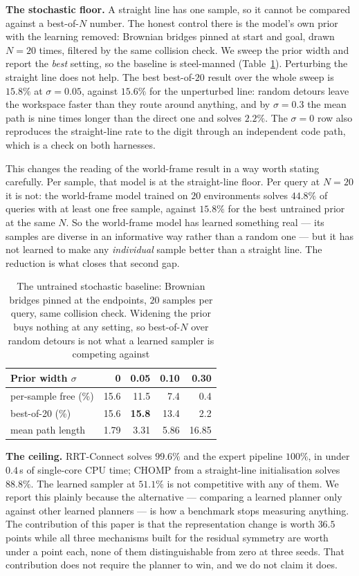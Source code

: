 \documentclass[10pt,twocolumn,letterpaper]{article}
\newcommand{\toprule}{\hline}
\newcommand{\midrule}{\hline}
\newcommand{\bottomrule}{\hline}
\theoremstyle{plain}
\begin{document}
\textbf{The stochastic floor.} A straight line has one sample, so it cannot be
compared against a best-of-$N$ number. The honest control there is the model's own
prior with the learning removed: Brownian bridges pinned at start and goal, drawn
$N=20$ times, filtered by the same collision check. We sweep the prior width and
report the \emph{best} setting, so the baseline is steel-manned
(Table~\ref{tab:prior}). Perturbing the straight line does not help. The best
best-of-$20$ result over the whole sweep is $15.8\%$ at $\sigma=0.05$, against
$15.6\%$ for the unperturbed line: random detours leave the workspace faster than
they route around anything, and by $\sigma=0.3$ the mean path is nine times longer
than the direct one and solves $2.2\%$. The $\sigma=0$ row also reproduces the
straight-line rate to the digit through an independent code path, which is a check
on both harnesses.

This changes the reading of the world-frame result in a way worth stating
carefully. Per sample, that model is at the straight-line floor. Per query at $N=20$
it is not: the world-frame model trained on $20$ environments solves $44.8\%$ of
queries with at least one free sample, against $15.8\%$ for the best untrained
prior at the same $N$. So the world-frame model has learned something real --- its
samples are diverse in an informative way rather than a random one --- but it has
not learned to make any \emph{individual} sample better than a straight line. The
reduction is what closes that second gap.

\begin{table}[t]
\centering
\footnotesize
\setlength{\tabcolsep}{5pt}
\begin{tabular}{lrrrr}
\toprule
Prior width $\sigma$ & 0 & 0.05 & 0.10 & 0.30 \\
\midrule
per-sample free (\%)  & 15.6 & 11.5 & 7.4 & 0.4 \\
best-of-20 (\%)       & 15.6 & \textbf{15.8} & 13.4 & 2.2 \\
mean path length      & 1.79 & 3.31 & 5.86 & 16.85 \\
\bottomrule
\end{tabular}
\caption{The untrained stochastic baseline: Brownian bridges pinned at the
endpoints, $20$ samples per query, same collision check. Widening the prior buys
nothing at any setting, so best-of-$N$ over random detours is not what a learned
sampler is competing against}
\label{tab:prior}
\end{table}

\textbf{The ceiling.} RRT-Connect solves $99.6\%$ and the expert pipeline $100\%$,
in under $0.4$\,s of single-core CPU time; CHOMP from a straight-line
initialisation solves $88.8\%$. The learned sampler at $51.1\%$ is not competitive
with any of them. We report this plainly because the alternative --- comparing a
learned planner only against other learned planners --- is how a benchmark stops
measuring anything. The contribution of this paper is that the representation
change is worth $36.5$ points while all three mechanisms built for the residual
symmetry are worth under a point each, none of them distinguishable from zero at
three seeds. That contribution does not require the planner to win, and we do not
claim it does.
\end{document}
